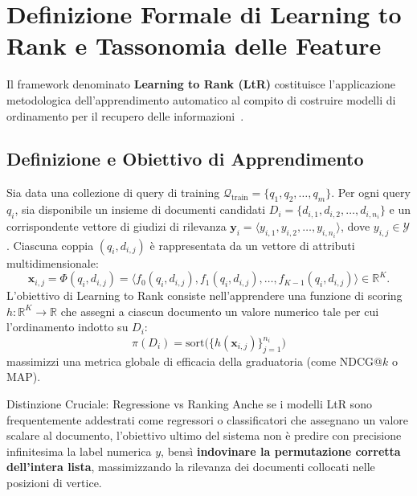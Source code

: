 \FloatBarrier
\section{Definizione Formale di Learning to Rank e Tassonomia delle Feature}
\label{sec:definizione-ltr-tassonomia-feature}

Il framework denominato \textbf{Learning to Rank (LtR)} costituisce l'applicazione metodologica dell'apprendimento automatico al compito di costruire modelli di ordinamento per il recupero delle informazioni~\cite{liu2009}.

\FloatBarrier
\subsection{Definizione e Obiettivo di Apprendimento}
\label{subsec:definizione-obiettivo-ltr}

\begin{definition}
Sia data una collezione di query di training $\mathcal{Q}_{\text{train}} = \{q_1, q_2, \dots, q_m\}$. Per ogni query $q_i$, sia disponibile un insieme di documenti candidati $D_i = \{d_{i,1}, d_{i,2}, \dots, d_{i, n_i}\}$ e un corrispondente vettore di giudizi di rilevanza $\mathbf{y}_i = \langle y_{i,1}, y_{i,2}, \dots, y_{i, n_i} \rangle$, dove $y_{i,j} \in \mathcal{Y}$.  
Ciascuna coppia $(q_i, d_{i,j})$ \`e rappresentata da un vettore di attributi multidimensionale:
\begin{equation}
    \mathbf{x}_{i,j} = \Phi(q_i, d_{i,j}) = \langle f_0(q_i, d_{i,j}), f_1(q_i, d_{i,j}), \dots, f_{K-1}(q_i, d_{i,j}) \rangle \in \mathbb{R}^K.
    \label{eq:feature-vector-ltr}
\end{equation}
L'obiettivo di Learning to Rank consiste nell'apprendere una funzione di scoring $h: \mathbb{R}^K \to \mathbb{R}$ che assegni a ciascun documento un valore numerico tale per cui l'ordinamento indotto su $D_i$:
\begin{equation}
    \pi(D_i) = \text{sort}\Big(\{h(\mathbf{x}_{i,j})\}_{j=1}^{n_i}\Big)
\end{equation}
massimizzi una metrica globale di efficacia della graduatoria (come NDCG@$k$ o MAP).
\end{definition}

\begin{alertblock}{Distinzione Cruciale: Regressione vs Ranking}
Anche se i modelli LtR sono frequentemente addestrati come regressori o classificatori che assegnano un valore scalare al documento, l'obiettivo ultimo del sistema non \`e predire con precisione infinitesima la label numerica $y$, bens\`i \textbf{indovinare la permutazione corretta dell'intera lista}, massimizzando la rilevanza dei documenti collocati nelle posizioni di vertice.
\end{alertblock}


